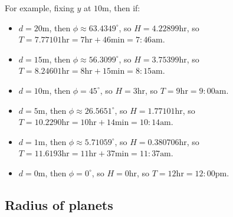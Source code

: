 \documentclass{article}
\begin{document}
For example, fixing \(y\) at \(10\text{m}\), then if:
\begin{itemize}
\item \(d = 20\text{m}\), then \(\phi \approx 63.4349^\circ\), so \(H = 4.22899\text{hr}\), so \(T = 7.77101\text{hr} = 7\text{hr} + 46\text{min} = 7\!\!:\!\!46\text{am}\). 
\item \(d = 15\text{m}\), then \(\phi \approx 56.3099^\circ\), so \(H = 3.75399\text{hr}\), so \(T = 8.24601\text{hr} = 8\text{hr} + 15\text{min} = 8\!\!:\!\!15\text{am}\). 
\item \(d = 10\text{m}\), then \(\phi = 45^\circ\), so \(H = 3\text{hr}\), so \(T = 9\text{hr} = 9\!\!:\!\!00\text{am}\). 
\item \(d = 5\text{m}\), then \(\phi \approx 26.5651^\circ\), so \(H = 1.77101\text{hr}\), so \(T = 10.2290\text{hr} = 10\text{hr} + 14\text{min} = 10\!\!:\!\!14\text{am}\).
\item \(d = 1\text{m}\), then \(\phi \approx 5.71059^\circ\), so \(H = 0.380706\text{hr}\), so \(T = 11.6193\text{hr} = 11\text{hr} + 37\text{min} = 11\!\!:\!\!37\text{am}\).
\item \(d = 0\text{m}\), then \(\phi = 0^\circ\), so \(H = 0\text{hr}\), so \(T = 12\text{hr} = 12\!\!:\!\!00\text{pm}\).
\end{itemize}




\subsection{Radius of planets}
\end{document}
